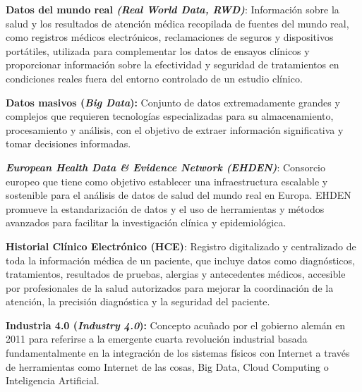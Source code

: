 
\textbf{Datos del mundo real \textit{(Real World Data, RWD)}}: Información sobre la salud y los resultados de atención médica recopilada de fuentes del mundo real, como registros médicos electrónicos, reclamaciones de seguros y dispositivos portátiles, utilizada para complementar los datos de ensayos clínicos y proporcionar información sobre la efectividad y seguridad de tratamientos en condiciones reales fuera del entorno controlado de un estudio clínico.

\textbf{Datos masivos (\textit{Big Data}):} Conjunto de datos extremadamente grandes y complejos que requieren tecnologías especializadas para su almacenamiento, procesamiento y análisis, con el objetivo de extraer información significativa y tomar decisiones informadas.



\textbf{\textit{European Health Data \& Evidence Network (EHDEN)}}: Consorcio europeo que tiene como objetivo establecer una infraestructura escalable y sostenible para el análisis de datos de salud del mundo real en Europa. EHDEN promueve la estandarización de datos y el uso de herramientas y métodos avanzados para facilitar la investigación clínica y epidemiológica.





\textbf{Historial Clínico Electrónico (HCE)}: Registro digitalizado y centralizado de toda la información médica de un paciente, que incluye datos como diagnósticos, tratamientos, resultados de pruebas, alergias y antecedentes médicos, accesible por profesionales de la salud autorizados para mejorar la coordinación de la atención, la precisión diagnóstica y la seguridad del paciente.




\textbf{Industria 4.0 (\textit{Industry 4.0}):} Concepto acuñado por el gobierno alemán en 2011 para referirse a la emergente cuarta revolución industrial basada fundamentalmente en la integración de los sistemas físicos con Internet a través de herramientas como Internet de las cosas, Big Data, Cloud Computing o Inteligencia Artificial.

